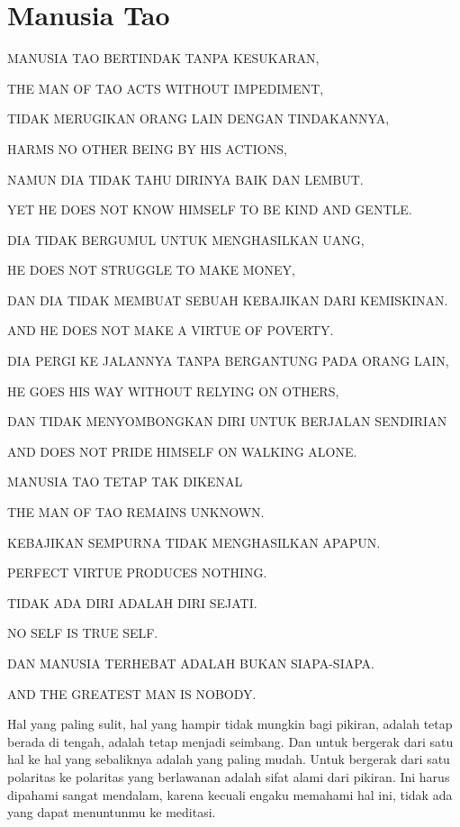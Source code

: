 \chapter{Manusia Tao}

\bahasa
MANUSIA TAO BERTINDAK TANPA KESUKARAN,

\english
THE MAN OF TAO ACTS WITHOUT IMPEDIMENT,

\bahasa
TIDAK MERUGIKAN ORANG LAIN DENGAN TINDAKANNYA,

\english
HARMS NO OTHER BEING BY HIS ACTIONS,

\bahasa
NAMUN DIA TIDAK TAHU DIRINYA BAIK DAN LEMBUT.

\english
YET HE DOES NOT KNOW HIMSELF TO BE KIND AND GENTLE.

\bahasa
DIA TIDAK BERGUMUL UNTUK MENGHASILKAN UANG,

\english
HE DOES NOT STRUGGLE TO MAKE MONEY,

\bahasa
DAN DIA TIDAK MEMBUAT SEBUAH KEBAJIKAN DARI KEMISKINAN.

\english
AND HE DOES NOT MAKE A VIRTUE OF POVERTY.

\bahasa
DIA PERGI KE JALANNYA TANPA BERGANTUNG PADA ORANG LAIN,

\english
HE GOES HIS WAY WITHOUT RELYING ON OTHERS,

\bahasa
DAN TIDAK MENYOMBONGKAN DIRI UNTUK BERJALAN SENDIRIAN

\english
AND DOES NOT PRIDE HIMSELF ON WALKING ALONE.

\bahasa
MANUSIA TAO TETAP TAK DIKENAL

\english
THE MAN OF TAO REMAINS UNKNOWN.

\bahasa
KEBAJIKAN SEMPURNA TIDAK MENGHASILKAN APAPUN.

\english
PERFECT VIRTUE PRODUCES NOTHING.

\bahasa
TIDAK ADA DIRI ADALAH DIRI SEJATI.

\english
NO SELF IS TRUE SELF.

\bahasa
DAN MANUSIA TERHEBAT ADALAH BUKAN SIAPA-SIAPA.

\english
AND THE GREATEST MAN IS NOBODY.

\bahasa
Hal yang paling sulit, hal yang hampir tidak mungkin bagi pikiran, adalah tetap berada di tengah, adalah tetap menjadi seimbang. Dan untuk bergerak dari satu hal ke hal yang sebaliknya adalah yang paling mudah. Untuk bergerak dari satu polaritas ke polaritas yang berlawanan adalah sifat alami dari pikiran. Ini harus dipahami sangat mendalam, karena kecuali engaku memahami hal ini, tidak ada yang dapat menuntunmu ke meditasi.

